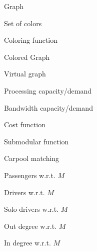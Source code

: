 \begin{description}[leftmargin=!,labelwidth=1.5cm]
    \item[$G$]              Graph
    \item[$C$]              Set of colors
    \item[$\chi$]           Coloring function
    \item[$G_{\chi}$]       Colored Graph
    \item[$\mathcal{G}$]    Virtual graph
    \item[$p$]              Processing capacity/demand
    \item[$b$]              Bandwidth capacity/demand
    \item[$c$]              Cost function
    \item[$f$]              Submodular function
    \item[$M$]              Carpool matching
    \item[$P_M$]            Passengers w.r.t. $M$
    \item[$D_M$]            Drivers w.r.t. $M$
    \item[$Z_M$]            Solo drivers w.r.t. $M$
    \item[$deg^M_{in}$]     Out degree w.r.t. $M$
    \item[$deg^M_{out}$]    In degree w.r.t. $M$
\end{description}
